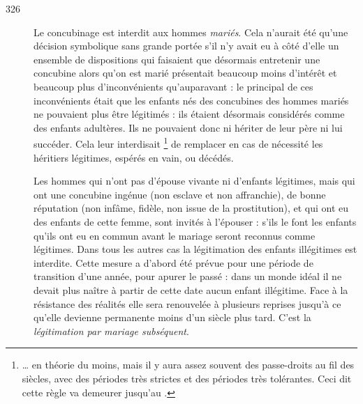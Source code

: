 \begin{description}
\item[326] Le concubinage est interdit aux hommes \emph{mariés}. Cela n'aurait été qu'une décision symbolique sans grande portée s'il n'y avait eu à côté d'elle un ensemble de dispositions qui faisaient que désormais entretenir une concubine alors qu'on est marié présentait beaucoup moins d'intérêt et beaucoup plus d'inconvénients qu'auparavant : le principal de ces inconvénients était que les enfants nés des concubines des hommes mariés ne pouvaient plus être légitimés : ils étaient désormais considérés comme des enfants adultères. Ils ne pouvaient donc ni hériter de leur père ni lui succéder. Cela leur interdisait%
\footnote{… en théorie du moins, mais il y aura assez souvent des passe-droits au fil des siècles, avec des périodes très strictes et des périodes très tolérantes. Ceci dit cette règle va demeurer jusqu'au .} 
de remplacer en cas de nécessité les héritiers légitimes, espérés en vain, ou décédés. 

Les hommes qui n'ont pas d'épouse vivante ni d'enfants légitimes, mais qui ont une concubine ingénue (non esclave et non affranchie), de bonne réputation (non infâme, fidèle, non issue de la prostitution), et qui ont eu des enfants de cette femme, sont invités à l'épouser : s'ils le font les enfants qu'ils ont eu en commun avant le mariage seront reconnus comme légitimes. Dans tous les autres cas la légitimation des enfants illégitimes est interdite. Cette mesure a d'abord été prévue pour une période de transition d'une année, pour apurer le passé : dans un monde idéal il ne devait plus naître à partir de cette date aucun enfant illégitime. Face à la résistance des réalités elle sera renouvelée à plusieurs reprises jusqu'à ce qu'elle devienne permanente moins d'un siècle plus tard. C'est la \emph{légitimation par mariage subséquent}.


\end{description}

